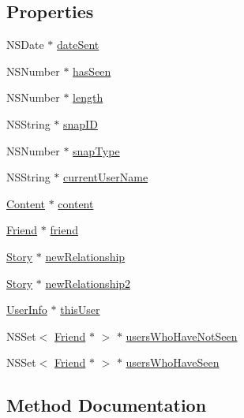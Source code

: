 \subsection*{Properties}
\begin{DoxyCompactItemize}
\item 
N\+S\+Date $\ast$ \hyperlink{interface_snap_a6691bfaebad4a5f85af2f2c81e182f73}{date\+Sent}
\item 
N\+S\+Number $\ast$ \hyperlink{interface_snap_ad7829a84e4fcd6dfc59187e925abf540}{has\+Seen}
\item 
N\+S\+Number $\ast$ \hyperlink{interface_snap_a71a054402e878feacaed0d6e41c70b74}{length}
\item 
N\+S\+String $\ast$ \hyperlink{interface_snap_ab9069d8e721ed8ce39c12b2591f99833}{snap\+ID}
\item 
N\+S\+Number $\ast$ \hyperlink{interface_snap_a68257cdbdfeb886f662b217a2d4cadf9}{snap\+Type}
\item 
N\+S\+String $\ast$ \hyperlink{interface_snap_a8e1375330a30756e65bda38b1621add1}{current\+User\+Name}
\item 
\hyperlink{interface_content}{Content} $\ast$ \hyperlink{interface_snap_aab265bdb30bcc6e7e7959c873de35446}{content}
\item 
\hyperlink{interface_friend}{Friend} $\ast$ \hyperlink{interface_snap_ad610ad587979481aa2ea6f6a917a0bfa}{friend}
\item 
\hyperlink{interface_story}{Story} $\ast$ \hyperlink{interface_snap_a53885a2a1b43f35ae0585d1bd0dc1991}{new\+Relationship}
\item 
\hyperlink{interface_story}{Story} $\ast$ \hyperlink{interface_snap_a255d69bfefa15984bfb544521bed2178}{new\+Relationship2}
\item 
\hyperlink{interface_user_info}{User\+Info} $\ast$ \hyperlink{interface_snap_a0dd784f55f0e861a4270f6546470f8bd}{this\+User}
\item 
N\+S\+Set$<$ \hyperlink{interface_friend}{Friend} $\ast$ $>$ $\ast$ \hyperlink{interface_snap_a29505408f6f861f86ed6ab15807e3e70}{users\+Who\+Have\+Not\+Seen}
\item 
N\+S\+Set$<$ \hyperlink{interface_friend}{Friend} $\ast$ $>$ $\ast$ \hyperlink{interface_snap_ad7eed44d77fe25a4721f170f1a526133}{users\+Who\+Have\+Seen}
\end{DoxyCompactItemize}


\subsection{Method Documentation}
\hypertarget{interface_snap_a647182ddde9d7db97df0bc5cda432d88}{}\label{interface_snap_a647182ddde9d7db97df0bc5cda432d88} 
